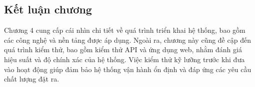\subsection{Kết luận chương}
Chương 4 cung cấp cái nhìn chi tiết về quá trình triển khai hệ thống, bao gồm các công nghệ và nền tảng được áp dụng. Ngoài ra, chương này cũng đề cập đến quá trình kiểm thử, bao gồm kiểm thử API và ứng dụng web,
nhằm đánh giá hiệu suất và độ chính xác của hệ thống. Việc kiểm thử kỹ lưỡng trước khi đưa vào hoạt động giúp đảm bảo hệ thống vận hành ổn định và đáp ứng các yêu cầu chất lượng đặt ra.
\newpage
